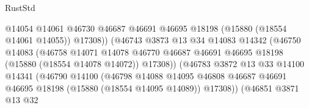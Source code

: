 \begin{lexlean}{RustStd}
\begin{coremodule}
                                            @14054
                                            @14061
                                            @46730
                                            @46687
                                            @46691
                                            @46695
                                            @18198
                                            (@15880 (@18554 @14061 @14055))
                                            @17308))
                                        (@46743
                                          @3873
                                          @13
                                          @34
                                          @14083
                                          @14342
                                          (@46750
                                            @14083
                                            (@46758
                                              @14071
                                              @14078
                                              @46770
                                              @46687
                                              @46691
                                              @46695
                                              @18198
                                              (@15880 (@18554 @14078 @14072))
                                              @17308))
                                          (@46783
                                            @3872
                                            @13
                                            @33
                                            @14100
                                            @14341
                                            (@46790
                                              @14100
                                              (@46798
                                                @14088
                                                @14095
                                                @46808
                                                @46687
                                                @46691
                                                @46695
                                                @18198
                                                (@15880 (@18554 @14095 @14089))
                                                @17308))
                                            (@46851
                                              @3871
                                              @13
                                              @32

\end{coremodule}
\end{lexlean}
